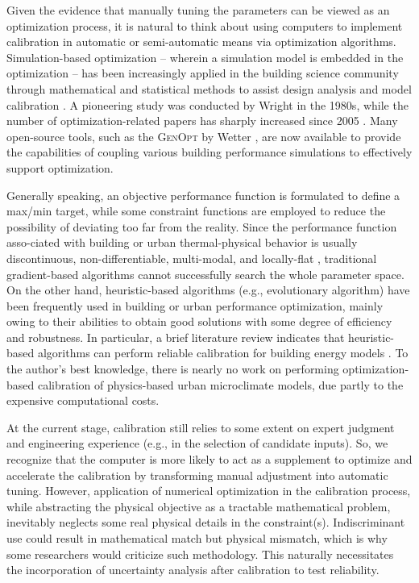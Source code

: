 Given the evidence that manually tuning the parameters can be viewed as an optimization process, it is natural to think about using computers to implement calibration in automatic or semi-automatic means via optimization algorithms. Simulation-based optimization -- wherein a simulation model is embedded in the optimization -- has been increasingly applied in the building science community through mathematical and statistical methods to assist design analysis \cite{nguyen2014review, evins2013review, machairas2014algorithms} and model calibration \cite{reddy2006literature, coakley2014review, fabrizio2015methodologies}. A pioneering study was conducted by Wright \cite{wright1986optimised} in the 1980s, while the number of optimization-related papers has sharply increased since 2005 \cite{nguyen2014review}. Many open-source tools, such as the \textsc{GenOpt} by Wetter \cite{wetter2009generic}, are now available to provide the capabilities of coupling various building performance simulations to effectively support optimization.

Generally speaking, an objective performance function is formulated to define a max/min target, while some constraint functions are employed to reduce the possibility of deviating too far from the reality. Since the performance function asso-ciated with building or urban thermal-physical behavior is usually discontinuous, non-differentiable, multi-modal, and locally-flat \cite{wetter2004convergent}, traditional gradient-based algorithms cannot successfully search the whole parameter space. On the other hand, heuristic-based algorithms (e.g., evolutionary algorithm) have been frequently used in building or urban performance optimization, mainly owing to their abilities to obtain good solutions with some degree of efficiency and robustness. In particular, a brief literature review indicates that heuristic-based algorithms can perform reliable calibration for building energy models \cite{robertson2015reduced, yang2016automated, ruiz2016genetic, ruiz2017analysis}. To the author's best knowledge, there is nearly no work on performing optimization-based calibration of physics-based urban microclimate models, due partly to the expensive computational costs.

At the current stage, calibration still relies to some extent on expert judgment and engineering experience (e.g., in the selection of candidate inputs). So, we recognize that the computer is more likely to act as a supplement to optimize and accelerate the calibration by transforming manual adjustment into automatic tuning. However, application of numerical optimization in the calibration process, while abstracting the physical objective as a tractable mathematical problem, inevitably neglects some real physical details in the constraint(s). Indiscriminant use could result in mathematical match but physical mismatch, which is why some researchers would criticize such methodology. This naturally necessitates the incorporation of uncertainty analysis after calibration to test reliability.

